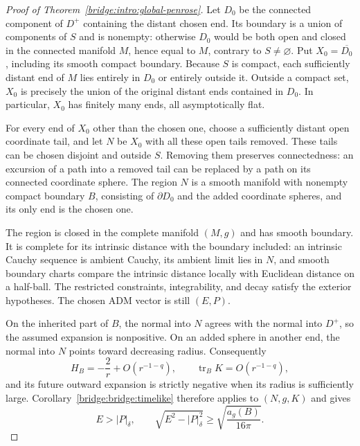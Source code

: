 \begin{proof}[Proof of Theorem~\ref{bridge:intro:global-penrose}]
Let $D_0$ be the connected component of $D^+$ containing the distant
chosen end.  Its boundary is a union of components of $S$ and is nonempty:
otherwise $D_0$ would be both open and closed in the connected manifold
$M$, hence equal to $M$, contrary to $S\ne\varnothing$.
Put $X_0=\overline{D_0}$, including its smooth compact boundary.
Because $S$ is compact, each sufficiently distant end of $M$ lies
entirely in $D_0$ or entirely outside it.  Outside a compact set, $X_0$
is precisely the union of the original distant ends contained in
$D_0$.  In particular, $X_0$ has finitely many ends, all asymptotically
flat.

For every end of $X_0$ other than the chosen one, choose a sufficiently
distant open coordinate tail, and let $N$ be $X_0$ with all
these open tails removed.  These tails can be chosen disjoint and
outside $S$.  Removing
them preserves connectedness: an excursion of a path into a removed
tail can be replaced by a path on its connected coordinate sphere.
The region $N$ is a smooth manifold with nonempty compact boundary
$B$, consisting of $\partial D_0$ and the added coordinate spheres,
and its only end is the chosen one.

The region is closed in the complete manifold $(M,g)$ and has smooth
boundary.  It is complete for its intrinsic distance with the boundary
included: an intrinsic Cauchy sequence is ambient Cauchy, its ambient
limit lies in $N$, and smooth boundary charts compare the intrinsic
distance locally with Euclidean distance on a half-ball.
The restricted constraints, integrability, and decay satisfy the
exterior hypotheses.  The chosen ADM vector is still $(E,P)$.

On the inherited part of $B$, the normal into $N$ agrees with the normal
into $D^+$, so the assumed expansion is nonpositive.  On an added sphere
in another end, the normal into $N$ points toward decreasing radius.
Consequently
\[
 H_B=-\frac2r+O(r^{-1-q}),\qquad
 \operatorname{tr}_B K=O(r^{-1-q}),
\]
and its future outward expansion is strictly negative when its radius
is sufficiently large.  Corollary~\ref{bridge:bridge:timelike} therefore applies
to $(N,g,K)$ and gives
\begin{equation}
\label{bridge:bridge:restricted-inequality}
 E>|P|_\delta,\qquad
 \sqrt{E^2-|P|_\delta^2}\ge\sqrt{\frac{a_g(B)}{16\pi}}.
\end{equation}


\end{proof}
